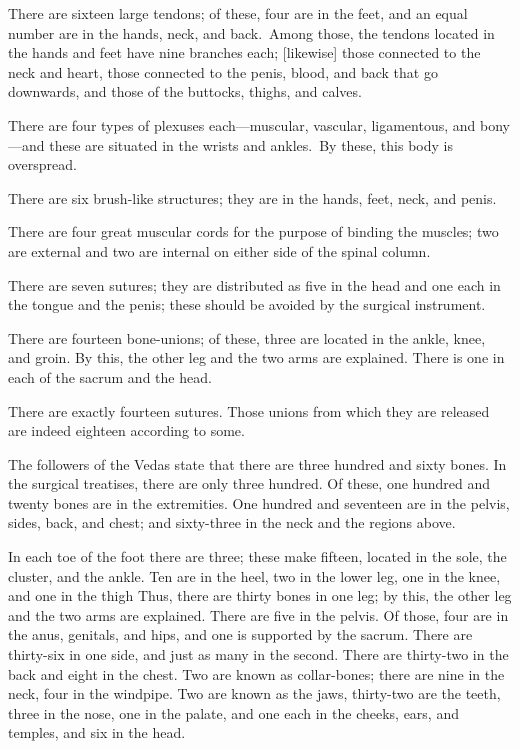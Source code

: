 \begin{translation}
\begin{tt}
\item[11]
There are sixteen large tendons; of these, four are in the feet, and an equal number are in the hands, neck, and back. Among those, the tendons located in the hands and feet have nine branches each; [likewise] those connected to the neck and heart, those connected to the penis, blood, and back that go downwards, and those of the buttocks, thighs, and calves. 

\item[12]
There are four types of plexuses each—muscular, vascular, ligamentous, and bony—and these are situated in the wrists and ankles. By these, this body is overspread. 

\item[13]
There are six brush-like structures; they are in the hands, feet, neck, and penis. 

\item[14]
There are four great muscular cords for the purpose of binding the muscles; two are external and two are internal on either side of the spinal column. 

\item[15]
There are seven sutures; they are distributed as five in the head and one each in the tongue and the penis; these should be avoided by the surgical instrument. 

\item[16]
There are fourteen bone-unions; of these, three are located in the ankle, knee, and groin.
By this, the other leg and the two arms are explained. 
There is one in each of the sacrum and the head. 

\item[17]
There are exactly fourteen sutures. 
Those unions from which they are released are indeed eighteen according to some. 

\item[18]
The followers of the Vedas state that there are three hundred and sixty bones. In the surgical treatises, there are only three hundred. Of these, one hundred and twenty bones are in the extremities.  One hundred and seventeen are in the pelvis, sides, back, and chest; and sixty-three in the neck and the regions above. 

\item[19]
In each toe of the foot there are three; these make fifteen, located in the sole, the cluster, and the ankle. Ten are in the heel, two in the lower leg, one in the knee, and one in the thigh Thus, there are thirty bones in one leg; by this, the other leg and the two arms are explained.  There are five in the pelvis.  Of those, four are in the anus, genitals, and hips, and one is supported by the sacrum.  There are thirty-six in one side, and just as many in the second. There are thirty-two in the back and eight in the chest. Two are known as collar-bones; there are nine in the neck, four in the windpipe.  Two are known as the jaws, thirty-two are the teeth, three in the nose, one in the palate, and one each in the cheeks, ears, and temples, and six in the head. 


\end{tt}
\end{translation}
